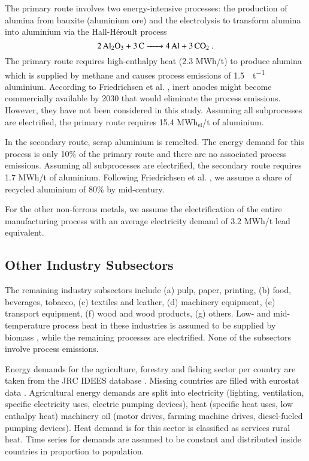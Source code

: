 The primary route involves two energy-intensive processes: the production of
alumina from bauxite (aluminium ore) and the electrolysis to transform alumina
into aluminium via the  Hall-H\'{e}roult process
\begin{equation}
    \ce{2Al2O3 + 3C -> 4Al + 3\co}.
\end{equation}
The primary route requires high-enthalpy heat (2.3 MWh/t) to produce alumina
which is supplied by methane and causes process emissions of
\SI{1.5}{\tco\per\tonne} aluminium. According to Friedrichsen et al. ,
inert anodes might become commercially available by 2030 that would eliminate
the process emissions. However, they have not been considered in this study.
Assuming all subprocesses are electrified, the primary route requires 15.4
MWh$_{\text{el}}$/t of aluminium.

In the secondary route, scrap aluminium is remelted. The energy demand for this
process is only 10\% of the primary route and there are no associated process
emissions. Assuming all subprocesses are electrified, the secondary route
requires 1.7 MWh/t of aluminium. Following Friedrichsen et al. , we assume
a share of recycled aluminium of 80\% by mid-century.

For the other non-ferrous metals, we assume the electrification of the entire
manufacturing process with an average electricity demand of 3.2 MWh\el/t lead
equivalent.

\subsection{Other Industry Subsectors}
\label{sec:si:industry:other}

The remaining industry subsectors include (a) pulp, paper, printing, (b) food,
beverages, tobacco, (c) textiles and leather, (d) machinery equipment, (e)
transport equipment, (f) wood and wood products, (g) others. Low- and
mid-temperature process heat in these industries is assumed to be supplied by
biomass , while the remaining processes are
electrified. None of the subsectors involve process emissions.

Energy demands for the agriculture, forestry and fishing sector per country are
taken from the JRC IDEES database . Missing countries are filled
with eurostat data . Agricultural energy
demands are split into electricity (lighting, ventilation, specific electricity
uses, electric pumping devices), heat (specific heat uses, low enthalpy heat)
machinery oil (motor drives, farming machine drives, diesel-fueled pumping
devices). Heat demand is for this sector is classified as services rural heat.
Time series for demands are assumed to be constant and distributed inside
countries in proportion to population.

